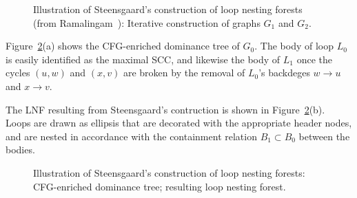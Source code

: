 { \begin{figure}
    \begin{center}
    \end{center}
    \caption{Illustration
       of Steensgaard's construction of loop nesting forests (from
       Ramalingam~\cite{DBLP:journals/toplas/Ramalingam02}):
       Iterative construction of graphs $G_1$ and $G_2$.}
    \label{FigLoopAnalysisRamalingamSteensgaardConstruction} 
  \end{figure} 

Figure~\ref{FigLoopAnalysisRamalingamSteensgaardOverlayAndANF}(a)
shows the CFG-enriched dominance tree of $G_0$. The body of loop $L_0$
is easily identified as the maximal SCC, and likewise the body of
$L_1$ once the cycles $(u, w)$ and $(x,v)$ are broken by the removal
of $L_0$'s backdeges $w \to u$ and $x \to v$.

The LNF resulting from Steensgaard's contruction is shown in
Figure~\ref{FigLoopAnalysisRamalingamSteensgaardOverlayAndANF}(b). Loops
are drawn as ellipsis that are decorated with the appropriate header
nodes, and are nested in accordance with the containment relation $B_1
\subset B_0$ between the bodies.

  \begin{figure}
    \begin{center}
    \hfill
    \hfill
    \hfill\null
    \end{center}
    \caption{Illustration of Steensgaard's construction of loop nesting forests: 
       \protect{} CFG-enriched dominance tree;
       \protect{} resulting loop nesting forest.}
    \label{FigLoopAnalysisRamalingamSteensgaardOverlayAndANF} 
  \end{figure} 

}
